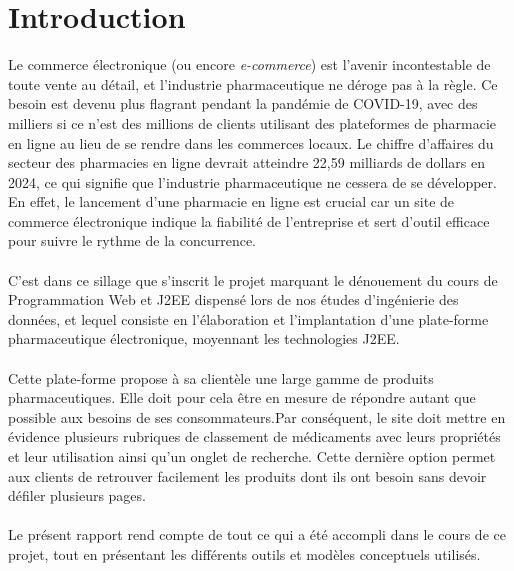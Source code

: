 \renewcommand{\abstractnamefont}{\normalfont\LARGE\bfseries}


\chapter*{Introduction}
\begin{spacing}{1}
\vspace{1cm}
Le commerce électronique (ou encore {\textit{e-commerce}}) est l'avenir incontestable de toute vente au détail, et l'industrie pharmaceutique ne déroge pas à la règle. Ce besoin est devenu plus flagrant pendant la pandémie de COVID-19, avec des milliers si ce n'est des millions de clients utilisant des plateformes de pharmacie en ligne au lieu de se rendre dans les commerces locaux. Le chiffre d'affaires du secteur des pharmacies en ligne devrait atteindre 22,59 milliards de dollars en 2024, ce qui signifie que l'industrie pharmaceutique ne cessera de se développer. En effet, le lancement d'une pharmacie en ligne est crucial car un site de commerce électronique indique la fiabilité de l'entreprise et sert d'outil efficace pour suivre le rythme de la concurrence.
\\ \\
C'est dans ce sillage que s'inscrit le projet marquant le dénouement du cours de Programmation Web et J2EE dispensé lors de nos études d'ingénierie des données, et lequel consiste en l'élaboration et l'implantation d'une plate-forme pharmaceutique électronique, moyennant les technologies J2EE.
\\ \\
Cette plate-forme propose à sa clientèle une large gamme de produits pharmaceutiques. Elle doit pour cela être en mesure de répondre autant que possible aux besoins de ses consommateurs.Par conséquent, le site doit mettre en évidence plusieurs rubriques de classement de médicaments avec leurs propriétés et leur utilisation ainsi qu’un onglet de recherche. Cette dernière option permet aux clients de retrouver facilement les produits dont ils ont besoin sans devoir défiler plusieurs pages.
\\ \\
Le présent rapport rend compte de tout ce qui a été accompli dans le cours de ce projet, tout en présentant les différents outils et modèles conceptuels utilisés. 

\end{spacing} 

